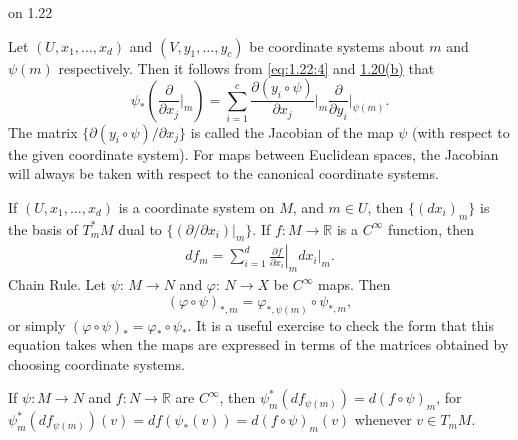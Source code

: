 \begin{remarks}{on 1.22}\label{thm:1.23}
	\begin{enumerate}
		 Let $(U, x_{1}, \ldots, x_{d})$ and $(V, y_{1}, \ldots, y_{c})$
		be coordinate systems about $m$ and $\psi(m)$
		respectively. Then it follows from \eqref{eq:1.22:4}
		and \hyperref[thm:1.20]{1.20(b)} that
		\[
			\psi_{*}\left(\frac{\partial}{\partial x_{j}}\bigg|_{m}\right)=\sum_{i=1}^{c}\frac{\partial(y_{i}\circ\psi)}{\partial x_{j}}\bigg|_{m}\frac{\partial}{\partial y_{i}}\bigg|_{\psi(m)}.
		\]
		The matrix $\{\partial(y_{i}\circ\psi)/\partial x_{j}\}$ is called the
		Jacobian of the map $\psi$ (with respect to the given coordinate system).
		For maps between Euclidean spaces, the Jacobian will always be taken
		with respect to the canonical coordinate systems. 

		 If $(U, x_1, \ldots, x_d)$ is a coordinate system on $M$,
		and $m \in U$, then $\{(dx_i)_m\}$ is the basis of $T_{m}^{*} M$ dual
		to $\{(\partial/\partial x_i)|_m\}$. If $f: M \to \mathbb{R}$
		is a $C^\infty$ function, then
		\[
			\begin{array}{r}{d f_{m}=\left.\sum_{i=1}^{d}\frac{\partial f}{\partial x_{i}}\right|_{m}d x_{i}|_{m}.}\end{array}
		\]
		 Chain Rule. Let  $ \psi $:  $ M \to N $ and  $ \varphi $:  $ N \to X $
		be  $ C^\infty $ maps. Then 
		\[
			(\varphi\circ\psi)_{*,m}=\varphi_{*,\psi(m)}\circ \psi_{*,m},
		\]
		or simply $(\varphi\circ\psi)_{*}=\varphi_{*}\circ \psi_{*}$. It is a useful
		exercise to check the form that this equation takes when the maps are
		expressed in terms of the matrices obtained by choosing coordinate systems.

		 If $\psi: M \to N$ and $f: N \to \mathbb{R}$ are $C^\infty$, then $\psi_m^{*}(df_{\psi(m)}) = d(f \circ \psi)_m$,
		for $\psi_m^{*}(df_{\psi(m)})(v) = df(\psi_{*}(v)) = d(f \circ \psi)_m(v)$ whenever $v \in T_{m} M$.


\end{enumerate}
\end{remarks}
